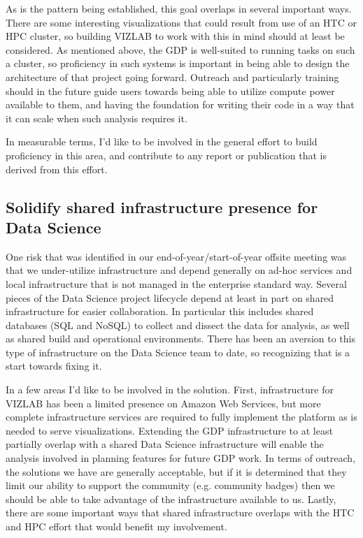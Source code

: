\documentclass{article}
\begin{document}
As is the pattern being established, this goal overlaps in several important ways.
There are some interesting visualizations that could result from use of an HTC or HPC cluster, so building VIZLAB to work with this in mind should at least be considered.
As mentioned above, the GDP is well-suited to running tasks on such a cluster, so proficiency in such systems is important in being able to design the architecture of that project going forward.
Outreach and particularly training should in the future guide users towards being able to utilize compute power available to them, and having the foundation for writing their code in a way that it can scale when such analysis requires it.

In measurable terms, I'd like to be involved in the general effort to build proficiency in this area, and contribute to any report or publication that is derived from this effort.

\subsection{Solidify shared infrastructure presence for Data Science}

One risk that was identified in our end-of-year/start-of-year offsite meeting was that we under-utilize infrastructure and depend generally on ad-hoc services and local infrastructure that is not managed in the enterprise standard way.
Several pieces of the Data Science project lifecycle depend at least in part on shared infrastructure for easier collaboration.
In particular this includes shared databases (SQL and NoSQL) to collect and dissect the data for analysis, as well as shared build and operational environments.
There has been an aversion to this type of infrastructure on the Data Science team to date, so recognizing that is a start towards fixing it.

In a few areas I'd like to be involved in the solution.
First, infrastructure for VIZLAB has been a limited presence on Amazon Web Services, but more complete infrastructure services are required to fully implement the platform as is needed to serve visualizations.
Extending the GDP infrastructure to at least partially overlap with a shared Data Science infrastructure will enable the analysis involved in planning features for future GDP work.
In terms of outreach, the solutions we have are generally acceptable, but if it is determined that they limit our ability to support the community (e.g. community badges) then we should be able to take advantage of the infrastructure available to us.
Lastly, there are some important ways that shared infrastructure overlaps with the HTC and HPC effort that would benefit my involvement.
\end{document}
